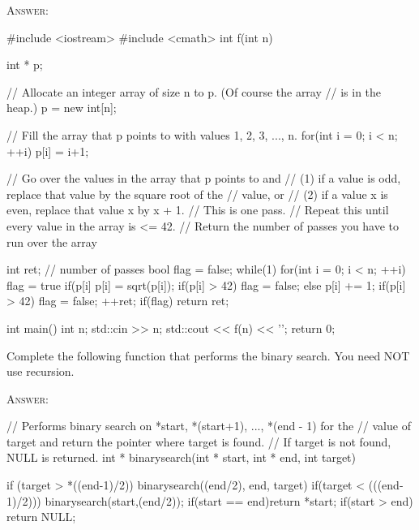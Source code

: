 \textsc{Answer:}\vspace{-3mm}
\begin{answercode}
#include <iostream>
#include <cmath>
int f(int n)
{
    int * p;

    // Allocate an integer array of size n to p. (Of course the array
    // is in the heap.)
    p = new int[n];

    // Fill the array that p points to with values 1, 2, 3, ..., n.
    for(int i = 0; i < n; ++i)
    {
        p[i] = i+1;
    }

    // Go over the values in the array that p points to and 
    // (1) if a value is odd, replace that value by the square root of the
    //     value, or
    // (2) if a value x is even, replace that value x by x + 1. 
    // This is one pass.
    // Repeat this until every value in the array is <= 42.
    // Return the number of passes you have to run over the array

    int ret; // number of passes
    bool flag = false;
    while(1)
    {
        for(int i = 0; i < n; ++i)
        {
                flag = true
                if(p[i] %
                {
                        p[i] = sqrt(p[i]);
                        if(p[i] > 42) flag = false;
                }
                else
                {
                        p[i] += 1;
                        if(p[i] > 42) flag = false;
                }
        }
        ++ret;
        if(flag) return ret;        
    }
}

int main()
{
    int n;
    std::cin >> n;
    std::cout << f(n) << '\n';
    return 0;
}
\end{answercode}

\newpage
\nextq
Complete the following function that performs the binary search.
You need NOT use recursion.
    
\textsc{Answer:}\vspace{-2mm}
\begin{answercode}
// Performs binary search on *start, *(start+1), ..., *(end - 1) for the
// value of target and return the pointer where target is found.
// If target is not found, NULL is returned.
int * binarysearch(int * start, int * end, int target)
{
        
        if (target > *((end-1)/2))
        {
        binarysearch((end/2), end, target)
        }
        if(target < (((end-1)/2)))
        {
        binarysearch(start,(end/2));
        }
        if(start == end)return *start;
        if(start > end) return NULL;

}
\end{answercode}


\newpage

